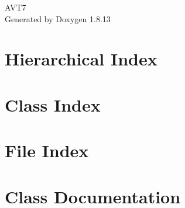\documentclass[twoside]{book}
\newcommand{\+}{\discretionary{\mbox{\scriptsize$\hookleftarrow$}}{}{}}
\newcommand{\clearemptydoublepage}{%
  \newpage{\pagestyle{empty}\cleardoublepage}%
}
\begin{document}
\hypersetup{pageanchor=false,
             bookmarksnumbered=true,
             pdfencoding=unicode
            }
\begin{titlepage}
\vspace*{7cm}
\begin{center}%
{\Large A\+V\+T7 }\\
\vspace*{1cm}
{\large Generated by Doxygen 1.8.13}\\
\end{center}
\end{titlepage}
\clearemptydoublepage
{}
\tableofcontents
\clearemptydoublepage
{}
\hypersetup{pageanchor=true}

\chapter{Hierarchical Index}

\chapter{Class Index}

\chapter{File Index}

\chapter{Class Documentation}




































\end{document}

